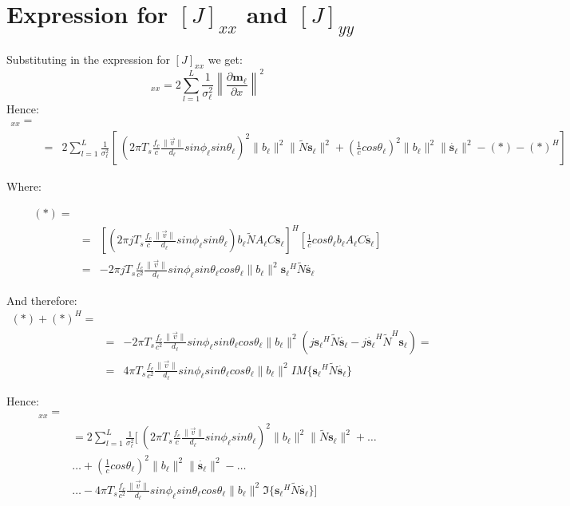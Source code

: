\section{Expression for $[J]_{x x}$ and $[J]_{y y}$ }
Substituting in the expression for $[J]_{x x}$ we get:
\begin{equation}
[J]_{x x} = 2\sum_{l=1}^{L}\frac{1}{\sigma_\ell ^2}\left\|\frac{\partial \mathbf{m_\ell }}{\partial x} \right\|^2
\end{equation}
Hence:
\begin{eqnarray}
[J]_{x x} = \\
&=& 2\sum_{l=1}^{L}\frac{1}{\sigma_\ell ^2} \left[\ \left(2 \pi T_s \frac{f_c}{c}\frac{\|\vec{v}\|}{d_\ell }sin\phi_\ell  sin\theta_\ell  \right)^2 \|b_\ell \|^2\|\tilde{N}\mathbf{s_\ell }\|^2+ \left( \frac{1}{c} cos\theta_\ell  \right)^2 \|b_\ell \|^2\|\mathbf{\dot{s_\ell }}\|^2 - (*) - (*)^H \right] \nonumber
\end{eqnarray}

Where:

\begin{eqnarray}
(*) = \\
&=& \left[ \left( 2 \pi j T_s \frac{f_c}{c} \frac{\|\vec{v}\|}{d_\ell } sin\phi_\ell  sin\theta_\ell  \right) b_\ell  \tilde{N} A_\ell  C \mathbf{s_\ell } \right]^H 
\left[ \frac{1}{c} cos \theta_\ell  b_\ell  A_\ell  C \mathbf{\dot{s_\ell }} \right] \nonumber \\
&=& -2 \pi j T_s \frac{f_c}{c^2} \frac{\|\vec{v}\|}{d_\ell } sin\phi_\ell  sin \theta_\ell  cos\theta_\ell  \|b_\ell \|^2  \mathbf{s_\ell }^H \tilde{N} \mathbf{\dot{s_\ell }} \nonumber
\end{eqnarray}

And therefore:
\begin{eqnarray}
(*) + (*)^H = \\
&=& -2 \pi T_s \frac{f_c}{c^2}\frac{\|\vec{v}\|}{d_\ell }sin\phi_\ell  sin\theta_\ell  cos \theta_\ell  \|b_\ell \|^2 (j \mathbf{s_\ell }^H\tilde{N}\mathbf{\dot{s_\ell }}-j \mathbf{\dot{s_\ell }}^H\tilde{N}^H\mathbf{s_\ell }) = \nonumber \\
&=& 4 \pi T_s \frac{f_c}{c^2}\frac{\|\vec{v}\|}{d_\ell }sin\phi_\ell  sin\theta_\ell  cos \theta_\ell  \|b_\ell \|^2 IM\{\mathbf{s_\ell }^H\tilde{N}\mathbf{\dot{s_\ell }}\} \nonumber
\end{eqnarray}


Hence:
\begin{eqnarray}
[J]_{x x} = \\
&= 2\sum_{l=1}^{L}\frac{1}{\sigma_\ell ^2} [\ \left(2 \pi T_s \frac{f_c}{c}\frac{\|\vec{v}\|}{d_\ell }sin\phi_\ell  sin\theta_\ell  \right)^2 \|b_\ell \|^2\|\tilde{N}\mathbf{s_\ell }\|^2+ \dots \nonumber \\
&\dots+ \left( \frac{1}{c} cos\theta_\ell  \right)^2 \|b_\ell \|^2\|\mathbf{\dot{s_\ell }}\|^2 - \dots \nonumber \\
&\dots - 4 \pi T_s \frac{f_c}{c^2}\frac{\|\vec{v}\|}{d_\ell }sin\phi_\ell  sin\theta_\ell  cos \theta_\ell  \|b_\ell \|^2 \Im\{\mathbf{s_\ell }^H\tilde{N}\mathbf{\dot{s_\ell }}\} ] \nonumber
\end{eqnarray}

